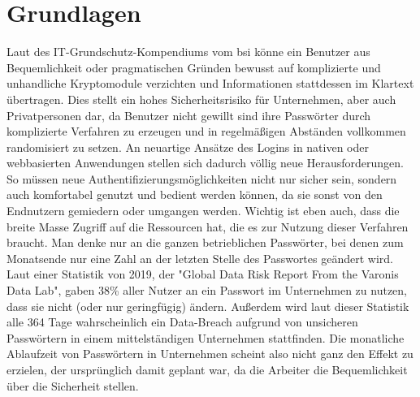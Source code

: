 \chapter{Grundlagen}
Laut des IT-Grundschutz-Kompendiums vom \ac{bsi} könne ein Benutzer aus Bequemlichkeit oder pragmatischen Gründen bewusst auf komplizierte und unhandliche Kryptomodule verzichten und Informationen stattdessen im Klartext übertragen. \cite{A1} Dies stellt ein hohes Sicherheitsrisiko für Unternehmen, aber auch Privatpersonen dar, da Benutzer nicht gewillt sind ihre Passwörter durch komplizierte Verfahren zu erzeugen und in regelmäßigen Abständen vollkommen randomisiert zu setzen. An neuartige Ansätze des Logins in nativen oder webbasierten Anwendungen stellen sich dadurch völlig neue Herausforderungen. So müssen neue Authentifizierungsmöglichkeiten nicht nur sicher sein, sondern auch komfortabel genutzt und bedient werden können, da sie sonst von den Endnutzern gemiedern oder umgangen werden. Wichtig ist eben auch, dass die breite Masse Zugriff auf die Ressourcen hat, die es zur Nutzung dieser Verfahren braucht. Man denke nur an die ganzen betrieblichen Passwörter, bei denen zum Monatsende nur eine Zahl an der letzten Stelle des Passwortes geändert wird. Laut einer Statistik von 2019, der "Global Data Risk Report From the Varonis Data Lab", gaben 38\% aller Nutzer an ein Passwort im Unternehmen zu nutzen, dass sie nicht (oder nur geringfügig) ändern. Außerdem wird laut dieser Statistik alle 364 Tage wahrscheinlich ein Data-Breach aufgrund von unsicheren Passwörtern in einem mittelständigen Unternehmen stattfinden. Die monatliche Ablaufzeit von Passwörtern in Unternehmen scheint also nicht ganz den Effekt zu erzielen, der ursprünglich damit geplant war, da die Arbeiter die Bequemlichkeit über die Sicherheit stellen.

